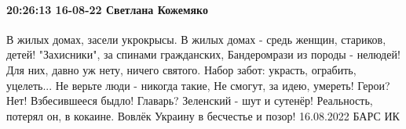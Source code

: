 
\paragraph{20:26:13 16-08-22 Светлана Кожемяко}

\obeycr
В жилых домах, засели укрокрысы.
В жилых домах - средь женщин, стариков, детей!
"Захисники", за спинами гражданских,
Бандеромрази из породы - нелюдей!
Для них, давно уж нету, ничего святого.
Набор забот: украсть, ограбить, уцелеть...
Не верьте люди - никогда такие,
Не смогут, за идею, умереть!
Герои? Нет! Взбесившееся быдло!
Главарь? Зеленский - шут и сутенёр!
Реальность, потерял он, в кокаине.
Вовлёк Украину в бесчестье и позор!
16.08.2022 БАРС ИК
\restorecr
